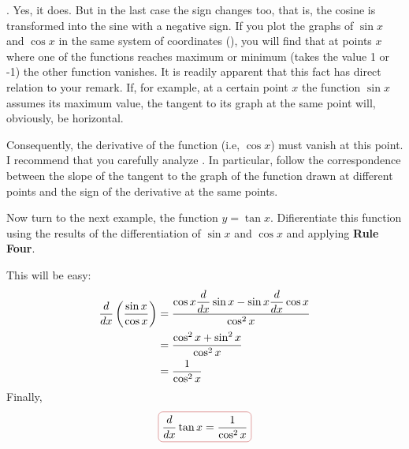 \athr. Yes, it does. But in the last case the sign changes too, that is, the cosine is transformed into the sine with a negative sign. If you plot the graphs of $\sin x$ and $\cos x$ in the same system of coordinates (), you will find that at points $x$ where one of the functions reaches maximum or minimum (takes the value 1 or -1) the other function vanishes. It is readily apparent that this fact has
direct relation to your remark. If, for example, at a certain point $x$ the function $\sin x$ assumes its maximum value, the tangent to its graph at the same point will, obviously, be horizontal. 

Consequently, the derivative of the function (i.e, $\cos x$) must vanish at this point. I recommend that you carefully analyze . In particular, follow the correspondence between the slope of the tangent to the graph of the function drawn at different points and the sign of the derivative at the same points.

Now turn to the next example, the function $y = \tan x$. Difierentiate this function using the results of the differentiation of $\sin x$ and $\cos x$ and applying \textbf{Rule Four}.

\rdr This will be easy:
\begin{align*}%
\ddx \left( \dfrac{\sin x}{\cos x} \right) & = \frac{\cos x \ddx \sin x - \sin x \ddx \cos x}{\cos^{2} x} \\
& = \frac{\cos^{2} x + \sin^{2} x}{\cos^{2} x} \\
& = \frac{1}{\cos^{2} x}
\end{align*}
Finally,
\begin{equation}%
\boxed{\ddx  \tan x = \frac{1}{ \cos^{2} x} }
\label{deriv-tan}
\end{equation}

